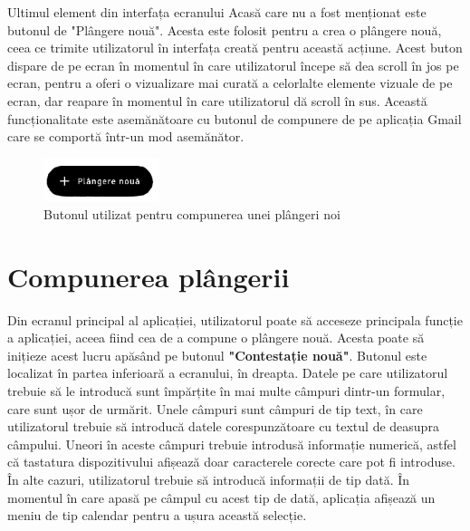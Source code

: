 \documentclass[12pt,a4paper]{report}
\theoremstyle{definition}
\theoremstyle{remark}
\begin{document}
Ultimul element din interfața ecranului Acasă care nu a fost menționat este butonul de "Plângere nouă". Acesta este folosit pentru a crea o plângere nouă, ceea ce trimite utilizatorul în interfața creată pentru această acțiune. Acest buton dispare de pe ecran în momentul în care utilizatorul începe să dea scroll în jos pe ecran, pentru a oferi o vizualizare mai curată a celorlalte elemente vizuale de pe ecran, dar reapare în momentul în care utilizatorul dă scroll în sus. Această funcționalitate este asemănătoare cu butonul de compunere de pe aplicația Gmail care se comportă într-un mod asemănător.
\begin{center}
\begin{figure}[H]
    	\centering
    	\includegraphics[width = 0.3\textwidth]{images/buton}
	\caption{Butonul utilizat pentru compunerea unei plângeri noi}
\end{figure}
\end{center}

\newpage
\section{Compunerea plângerii}
\vspace{20pt}
Din ecranul principal al aplicației, utilizatorul poate să acceseze principala funcție a aplicației, aceea fiind cea de a compune o plângere nouă. Acesta poate să inițieze acest lucru apăsând pe butonul \textbf{"Contestație nouă"}. Butonul este localizat în partea inferioară a ecranului, în dreapta. Datele pe care utilizatorul trebuie să le introducă sunt împărțite în mai multe câmpuri dintr-un formular, care sunt ușor de urmărit. Unele câmpuri sunt câmpuri de tip text, în care utilizatorul trebuie să introducă datele corespunzătoare cu textul de deasupra câmpului. Uneori în aceste câmpuri trebuie introdusă informație numerică, astfel că tastatura dispozitivului afișează doar caracterele corecte care pot fi introduse. În alte cazuri, utilizatorul trebuie să introducă informații de tip dată. În momentul în care apasă pe câmpul cu acest tip de dată, aplicația afișează un meniu de tip calendar pentru a ușura această selecție. 
\end{document}
